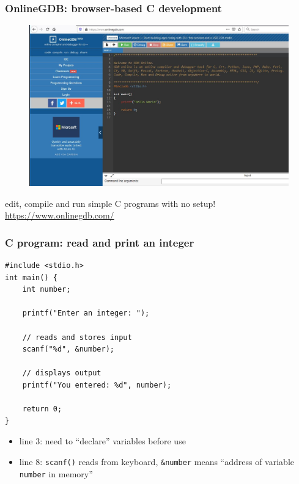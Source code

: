 \documentclass[english,14pt]{beamer}
\begin{document}

\begin{frame}[fragile]

\frametitle{OnlineGDB: browser-based C development}

\begin{figure}[ht]
	\centering
	\includegraphics[width=.7\textwidth]{figures/OnlineGDB}
\end{figure}

edit, compile and run simple C programs with no setup! \\
\href{https://www.onlinegdb.com/}{https://www.onlinegdb.com/}

\end{frame}



\begin{frame}[fragile]


\frametitle{C program: read and print an integer}
\vspace*{-3mm}
\begin{lstlisting}[style=CStyle,basicstyle=\footnotesize]
#include <stdio.h>
int main() {   
    int number;
   
    printf("Enter an integer: ");  
    
    // reads and stores input
    scanf("%d", &number);

    // displays output
    printf("You entered: %d", number);
    
    return 0;
}
\end{lstlisting}
\vspace*{-3mm}
\begin{itemize}
	\item line 3: need to ``declare'' variables before use
	\item line 8: \texttt{scanf()} reads from keyboard, \texttt{\&number} means ``address of variable \texttt{number} in memory''
\end{itemize}

\end{frame}
\end{document}
